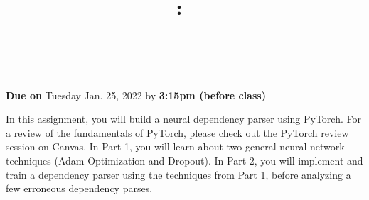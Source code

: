 \documentclass[answers]{exam}
\title{
\vspace{-1in}
\textmd{\textbf{\hmwkClass:\ \hmwkTitle} \\ \hmwkAuthorName}\\
}
\author{}
\date{}
\begin{document}
\maketitle

\begin{center}
    \large{\textbf{Due on} Tuesday Jan. 25, 2022 by \textbf{3:15pm (before class)}}
\end{center}

In this assignment, you will build a neural dependency parser using PyTorch. For a review of the fundamentals of PyTorch, please check out the PyTorch review session on Canvas.  In Part 1, you will learn about two general neural network techniques (Adam Optimization and Dropout). In Part 2, you will implement and train a dependency parser using the techniques from Part 1, before analyzing a few erroneous dependency parses.
\begin{questions}
    
    \newpage
    
\end{questions}


\end{document}
